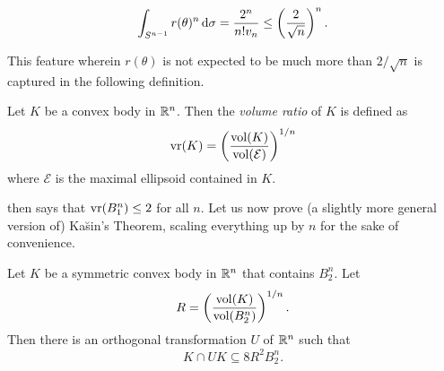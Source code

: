 \begin{equation}
\label{eqn cross-polytope volume ratio limit}
    \int_{S^{n-1}} r(\theta)^n\operatorname{d}\!{\sigma} = \frac{2^n}{n! v_n} \leq \left(\frac{2}{\sqrt{n}}\right)^n.
\end{equation}

This feature wherein $r(\theta)$ is not expected to be much more than $2/\sqrt{n}$ is captured in the following definition.

\begin{fdef}
Let $K$ be a convex body in $\mathbb{R}^n$. Then the \textit{volume ratio} of $K$ is defined as
\[ \operatorname{vr}(K) = \left(\frac{\operatorname{vol}(K)}{\operatorname{vol}(\mathcal{E})}\right)^{1/n} \]
where $\mathcal{E}$ is the maximal ellipsoid contained in $K$.
\end{fdef}

 then says that $\operatorname{vr}(B_1^n)\leq 2$ for all $n$. Let us now prove (a slightly more general version of) Ka\u{s}in's Theorem, scaling everything up by $n$ for the sake of convenience.

\clearpage
\begin{ftheo}
\label{kasin's theorem orthogonal intersection}
Let $K$ be a symmetric convex body in $\mathbb{R}^n$ that contains $B_2^n$. Let
\[ R = \left(\frac{\operatorname{vol}(K)}{\operatorname{vol}(B_2^n)}\right)^{1/n}. \]
Then there is an orthogonal transformation $U$ of $\mathbb{R}^n$ such that
\[ K\cap U K \subseteq 8R^2 B_2^n. \]
\end{ftheo}

